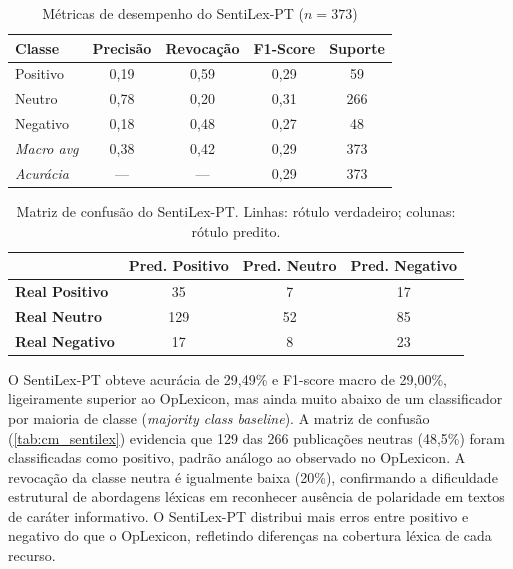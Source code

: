 \begin{table}[!htbp]
	\caption[Métricas de desempenho — SentiLex-PT]{Métricas de desempenho do SentiLex-PT ($n = 373$)}
	\label{tab:metrics_sentilex}
	\centering
	\begin{tabular}{lcccc}
		\hline
		\textbf{Classe}    & \textbf{Precisão} & \textbf{Revocação} & \textbf{F1-Score} & \textbf{Suporte} \\
		\hline
		Positivo           & 0,19              & 0,59               & 0,29              & 59  \\
		\hline
		Neutro             & 0,78              & 0,20               & 0,31              & 266 \\
		\hline
		Negativo           & 0,18              & 0,48               & 0,27              & 48  \\
		\hline
		\textit{Macro avg} & 0,38              & 0,42               & 0,29              & 373 \\
		\hline
		\textit{Acurácia}  & ---               & ---                & 0,29              & 373 \\
		\hline
	\end{tabular}
\end{table}

\begin{table}[!htbp]
	\caption[Matriz de confusão — SentiLex-PT]{Matriz de confusão do SentiLex-PT. Linhas: rótulo verdadeiro; colunas: rótulo predito.}
	\label{tab:cm_sentilex}
	\centering
	\begin{tabular}{lccc}
		\hline
		& \textbf{Pred. Positivo} & \textbf{Pred. Neutro} & \textbf{Pred. Negativo} \\
		\hline
		\textbf{Real Positivo} & 35                      & 7                     & 17                      \\
		\hline
		\textbf{Real Neutro}   & 129                     & 52                    & 85                      \\
		\hline
		\textbf{Real Negativo} & 17                      & 8                     & 23                      \\
		\hline
	\end{tabular}
\end{table}

O SentiLex-PT obteve acurácia de 29,49\% e F1-score macro de 29,00\%, ligeiramente superior ao OpLexicon, mas ainda muito abaixo de um classificador por maioria de classe (\textit{majority class baseline}). A matriz de confusão (\autoref{tab:cm_sentilex}) evidencia que 129 das 266 publicações neutras (48,5\%) foram classificadas como positivo, padrão análogo ao observado no OpLexicon. A revocação da classe neutra é igualmente baixa (20\%), confirmando a dificuldade estrutural de abordagens léxicas em reconhecer ausência de polaridade em textos de caráter informativo. O SentiLex-PT distribui mais erros entre positivo e negativo do que o OpLexicon, refletindo diferenças na cobertura léxica de cada recurso.

